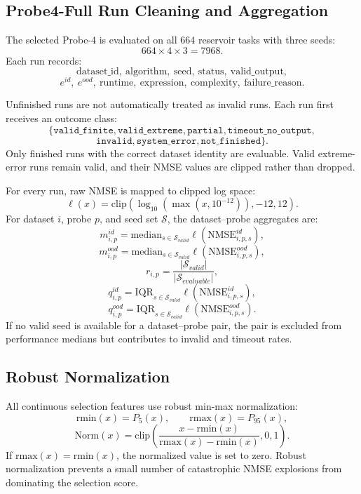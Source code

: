 \subsection{Probe4-Full Run Cleaning and Aggregation}
\label{app:probe4-run-cleaning}

The selected Probe-4 is evaluated on all 664 reservoir tasks with three seeds:
\[
664 \times 4 \times 3 = 7968.
\]
Each run records:
\[
\mathrm{dataset\_id},\ 
\mathrm{algorithm},\ 
\mathrm{seed},\ 
\mathrm{status},\ 
\mathrm{valid\_output},
\]
\[
e^{id},\ 
e^{ood},\ 
\mathrm{runtime},\ 
\mathrm{expression},\ 
\mathrm{complexity},\ 
\mathrm{failure\_reason}.
\]

Unfinished runs are not automatically treated as invalid runs. Each run first receives an outcome class:
\[
\{
\texttt{valid\_finite},
\texttt{valid\_extreme},
\texttt{partial},
\texttt{timeout\_no\_output},
\]
\[
\texttt{invalid},
\texttt{system\_error},
\texttt{not\_finished}
\}.
\]
Only finished runs with the correct dataset identity are evaluable. Valid extreme-error runs remain valid, and their NMSE values are clipped rather than dropped.

For every run, raw NMSE is mapped to clipped log space:
\[
\ell(x)
=
\mathrm{clip}
\left(
\log_{10}(\max(x,10^{-12})),
-12,
12
\right).
\]
For dataset \(i\), probe \(p\), and seed set \(\mathcal{S}\), the dataset--probe aggregates are:
\[
m_{i,p}^{id}
=
\mathrm{median}_{s\in\mathcal{S}_{valid}}
\ell(\mathrm{NMSE}_{i,p,s}^{id}),
\]
\[
m_{i,p}^{ood}
=
\mathrm{median}_{s\in\mathcal{S}_{valid}}
\ell(\mathrm{NMSE}_{i,p,s}^{ood}),
\]
\[
r_{i,p}
=
\frac{|\mathcal{S}_{valid}|}{|\mathcal{S}_{evaluable}|},
\]
\[
q_{i,p}^{id}
=
\mathrm{IQR}_{s\in\mathcal{S}_{valid}}
\ell(\mathrm{NMSE}_{i,p,s}^{id}),
\]
\[
q_{i,p}^{ood}
=
\mathrm{IQR}_{s\in\mathcal{S}_{valid}}
\ell(\mathrm{NMSE}_{i,p,s}^{ood}).
\]
If no valid seed is available for a dataset--probe pair, the pair is excluded from performance medians but contributes to invalid and timeout rates.


\subsection{Robust Normalization}
\label{app:robust-normalization}

All continuous selection features use robust min-max normalization:
\[
\mathrm{rmin}(x)=P_5(x),
\qquad
\mathrm{rmax}(x)=P_{95}(x),
\]
\[
\mathrm{Norm}(x)
=
\mathrm{clip}
\left(
\frac{x-\mathrm{rmin}(x)}
{\mathrm{rmax}(x)-\mathrm{rmin}(x)},
0,
1
\right).
\]
If \(\mathrm{rmax}(x)=\mathrm{rmin}(x)\), the normalized value is set to zero. Robust normalization prevents a small number of catastrophic NMSE explosions from dominating the selection score.


